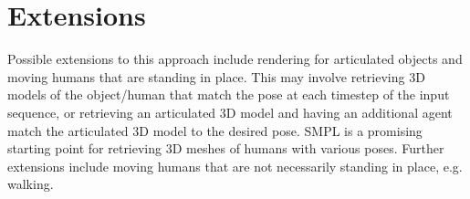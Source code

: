 \section{Extensions}
\label{sec:extensions}

Possible extensions to this approach include rendering for articulated objects and moving humans that are standing in place. This may involve retrieving 3D models of the object/human that match the pose at each timestep of the input sequence, or retrieving an articulated 3D model and having an additional agent match the articulated 3D model to the desired pose. SMPL is a promising starting point for retrieving 3D meshes of humans with various poses. Further extensions include moving humans that are not necessarily standing in place, e.g. walking.
